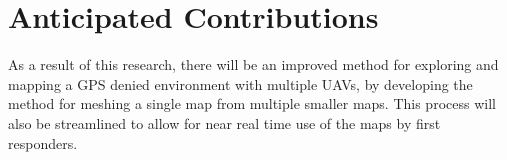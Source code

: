 \documentclass[12pt, letterpaper]{article}
\begin{document}

%

\section{Anticipated Contributions}

As a result of this research, there will be an improved method for exploring and mapping a GPS denied environment with multiple UAVs, by developing the method for meshing a single map from multiple smaller maps. This process will also be streamlined to allow for near real time use of the maps by first responders.  


\pagebreak



\end{document}
